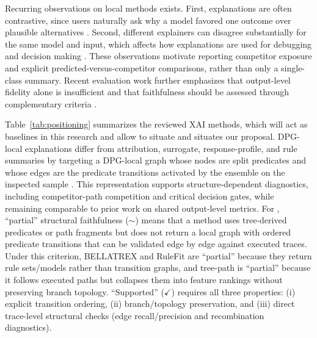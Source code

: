 \documentclass[runningheads]{llncs}
\begin{document}
Recurring observations on local methods exists.
First, explanations are often contrastive, since users naturally ask why a model favored one outcome over plausible alternatives \cite{miller2019explanation}. Second, different explainers can disagree substantially for the same model and input, which affects how explanations are used for debugging and decision making \cite{krishna2022disagreement}. These observations motivate reporting competitor exposure and explicit predicted-versus-competitor comparisons, rather than only a single-class summary. Recent evaluation work further emphasizes that output-level fidelity alone is insufficient and that faithfulness should be assessed through complementary criteria \cite{nauta2023anecdotal,doshi2017rigorous}. 

Table~\ref{tab:positioning} summarizes the reviewed XAI methods, which will act as baselines in this research and allow to situate and situates our proposal. 
DPG-local explanations differ from attribution, surrogate, response-profile, and rule summaries by targeting a DPG-local graph whose nodes are split predicates and whose edges are the predicate transitions activated by the ensemble on the inspected sample \cite{arrighi2024decision}. This representation supports structure-dependent diagnostics, including competitor-path competition and critical decision gates, while remaining comparable to prior work on shared output-level metrics.
For , ``partial'' structural faithfulness ($\sim$) means that a method uses tree-derived predicates or path fragments but does not return a local graph with ordered predicate transitions that can be validated edge by edge against executed traces. Under this criterion, BELLATREX and RuleFit are ``partial'' because they return rule sets/models rather than transition graphs, and tree-path is ``partial'' because it follows executed paths but collapses them into feature rankings without preserving branch topology. ``Supported'' ($\checkmark$) requires all three properties: (i) explicit transition ordering, (ii) branch/topology preservation, and (iii) direct trace-level structural checks (edge recall/precision and recombination diagnostics).
\end{document}
